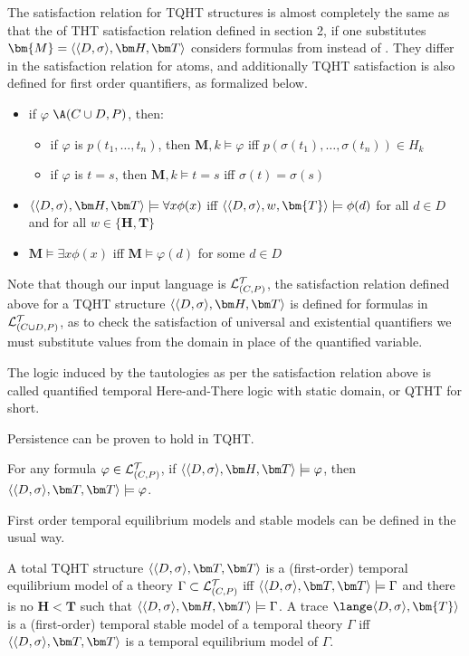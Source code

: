 The satisfaction relation for TQHT structures is almost completely the
same as that the of THT satisfaction relation defined in section 2, if
one substitutes $\bm{M}=\qthandt$ considers formulas from \langcdpt
instead of \langat. They differ in the satisfaction relation for
atoms, and additionally TQHT satisfaction is also defined for first
order quantifiers, as formalized below.

\begin{itemize}
  \item if $\varphi$ \in $\A(C \cup D,P)$, then:
    \begin{itemize}
    \item if $\varphi$ is $p(t_1,\dots,t_n)$, then $\bm{M},k \models \varphi$ iff $p(\sigma(t_1), \dots, \sigma(t_n))\in H_k$
    \item if $\varphi$ is $t = s$, then  $\bm{M},k \models t = s$ iff $\sigma(t) = \sigma(s)$
    \end{itemize}
  \item $\qthandt \models \forall x \phi(x)$ iff $\langle \dsigma, w,\bm{T} \rangle \models \phi(d)$ for all $d \in D$ and for all $w \in \{\bm{H}, \bm{T}\}$ 
  \item $\bm{M} \models \exists x \phi(x)$ iff $\bm{M} \models \varphi(d)$ for some $d \in D$
\end{itemize}
Note that though our input language is $\mathcal{L}_{(C,P)}^\mathcal{T}$, the satisfaction
relation defined above for a TQHT structure $\qthandt$ is defined for
formulas in $\mathcal{L}_{(C \cup D,P)}^\mathcal{T}$, as to check the satisfaction of universal and
existential quantifiers we must substitute values from the domain in
place of the quantified variable.

The logic induced by the tautologies as per the satisfaction relation
above is called quantified temporal Here-and-There logic with static
domain, or QTHT for short.

Persistence can be proven to hold in TQHT.

\begin{proposition}
  For any formula $\varphi \in \mathcal{L}_{(C,P)}^\mathcal{T}$, if $\qthandt \models \varphi$, then
  $\qttandt \models \varphi$.
\end{proposition}

First order temporal equilibrium models and stable models can be defined in the usual way.

\begin{definition}
  A total TQHT structure $\qttandt$ is a (first-order) temporal
  equilibrium model of a theory $\Gamma \subset \mathcal{L}_{(C,P)}^\mathcal{T}$ iff
  $\qttandt \models \Gamma$ and there is no $\bm{H} < \bm{T}$ such
  that $\qthandt \models \Gamma$. A trace
  $\lange \dsigma, \bm{T} \rangle$ is a (first-order) temporal stable
  model of a temporal theory $\Gamma$ iff $\qttandt$ is a temporal
  equilibrium model of $\Gamma$.
\end{definition}


